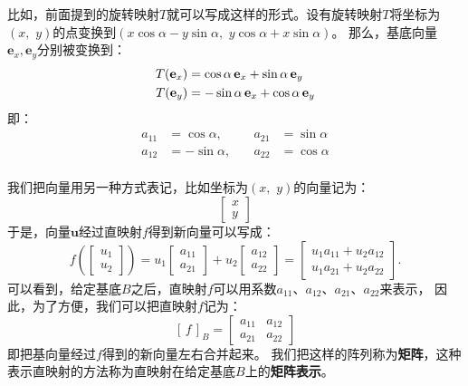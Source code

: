 \documentclass[12pt,UTF8]{ctexbook}
\begin{document}
比如，前面提到的旋转映射$T$就可以写成这样的形式。设有旋转映射$T$将坐标为$(x,\,\, y)$的点变换到$(x\cos{\alpha} - y\sin{\alpha},\,\,y\cos{\alpha} + x\sin{\alpha})$。
那么，基底向量$\mathbf{e}_x, \mathbf{e}_y$分别被变换到：
\begin{align}
    T(\mathbf{e}_x) &= \cos{\alpha}\,\mathbf{e}_x + \sin{\alpha}\,\mathbf{e}_y \notag \\
    T(\mathbf{e}_y) &= -\sin{\alpha}\,\mathbf{e}_x + \cos{\alpha}\,\mathbf{e}_y \notag 
\end{align}
即：
$$
\begin{array}{rlrl}
    a_{11} &= \cos{\alpha}, \quad & a_{21} &= \sin{\alpha} \\
    a_{12} &= -\sin{\alpha}, \quad & a_{22} &= \cos{\alpha} \\
\end{array}
$$

我们把向量用另一种方式表记，比如坐标为$(x, \,\,y)$的向量记为：
$$ \begin{bmatrix}
    x\\ y
\end{bmatrix}$$
于是，向量$\mathbf{u}$经过直映射$f$得到新向量可以写成：
$$ f\left(\begin{bmatrix}
    u_1\\ u_2
\end{bmatrix}\right) = u_1\begin{bmatrix}
    a_{11}\\ a_{21}
\end{bmatrix} + u_2 \begin{bmatrix}
    a_{12}\\ a_{22}
\end{bmatrix} = \begin{bmatrix}
    u_1a_{11} + u_2a_{12}\\ u_1a_{21} + u_2a_{22} 
\end{bmatrix}.$$
可以看到，给定基底$B$之后，直映射$f$可以用系数$a_{11}$、$a_{12}$、$a_{21}$、$a_{22}$来表示，
因此，为了方便，我们可以把直映射$f$记为：
$$
[\,f\,]_B = 
\begin{bmatrix}
    a_{11} & a_{12} \\ a_{21} & a_{22}
\end{bmatrix}
$$
即把基向量经过$f$得到的新向量左右合并起来。
我们把这样的阵列称为\textbf{矩阵}，这种表示直映射的方法称为直映射在给定基底$B$上的\textbf{矩阵表示}。
\end{document}
